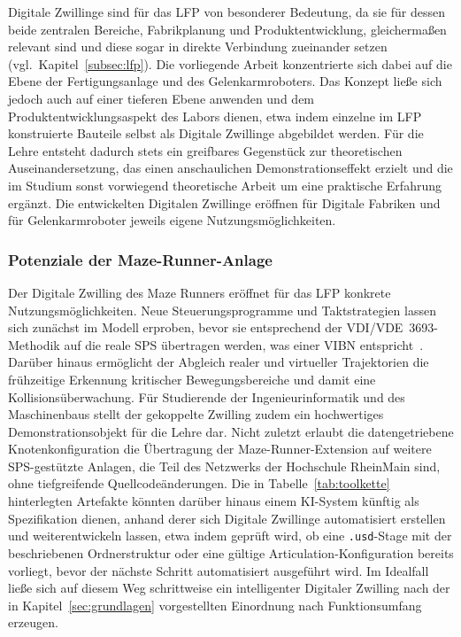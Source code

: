 Digitale Zwillinge sind für das LFP von besonderer Bedeutung, da sie für dessen beide zentralen Bereiche, Fabrikplanung und Produktentwicklung, gleichermaßen relevant sind und diese sogar in direkte Verbindung zueinander setzen (vgl.\ Kapitel~\ref{subsec:lfp}). Die vorliegende Arbeit konzentrierte sich dabei auf die Ebene der Fertigungsanlage und des Gelenkarmroboters. Das Konzept ließe sich jedoch auch auf einer tieferen Ebene anwenden und dem Produktentwicklungsaspekt des Labors dienen, etwa indem einzelne im LFP konstruierte Bauteile selbst als Digitale Zwillinge abgebildet werden. Für die Lehre entsteht dadurch stets ein greifbares Gegenstück zur theoretischen Auseinandersetzung, das einen anschaulichen Demonstrationseffekt erzielt und die im Studium sonst vorwiegend theoretische Arbeit um eine praktische Erfahrung ergänzt.
Die entwickelten Digitalen Zwillinge eröffnen für Digitale Fabriken und für Gelenkarmroboter jeweils eigene Nutzungsmöglichkeiten.

\subsubsection{Potenziale der Maze-Runner-Anlage}
Der Digitale Zwilling des Maze Runners eröffnet für das LFP konkrete Nutzungsmöglichkeiten.
Neue Steuerungsprogramme und Taktstrategien lassen sich zunächst im Modell erproben, bevor sie entsprechend der VDI/VDE~3693-Methodik auf die reale SPS übertragen werden, was einer VIBN entspricht~\cite{vdi3693,lechler2019}.
Darüber hinaus ermöglicht der Abgleich realer und virtueller Trajektorien die frühzeitige Erkennung kritischer Bewegungsbereiche und damit eine Kollisionsüberwachung.
Für Studierende der Ingenieurinformatik und des Maschinenbaus stellt der gekoppelte Zwilling zudem ein hochwertiges Demonstrationsobjekt für die Lehre dar.
Nicht zuletzt erlaubt die datengetriebene Knotenkonfiguration die Übertragung der Maze-Runner-Extension auf weitere SPS-gestützte Anlagen, die Teil des Netzwerks der Hochschule RheinMain sind, ohne tiefgreifende Quellcodeänderungen.
Die in Tabelle~\ref{tab:toolkette} hinterlegten Artefakte könnten darüber hinaus einem KI-System künftig als Spezifikation dienen, anhand derer sich Digitale Zwillinge automatisiert erstellen und weiterentwickeln lassen, etwa indem geprüft wird, ob eine \texttt{.usd}-Stage mit der beschriebenen Ordnerstruktur oder eine gültige Articulation-Konfiguration bereits vorliegt, bevor der nächste Schritt automatisiert ausgeführt wird. Im Idealfall ließe sich auf diesem Weg schrittweise ein intelligenter Digitaler Zwilling nach der in Kapitel~\ref{sec:grundlagen} vorgestellten Einordnung nach Funktionsumfang erzeugen.

